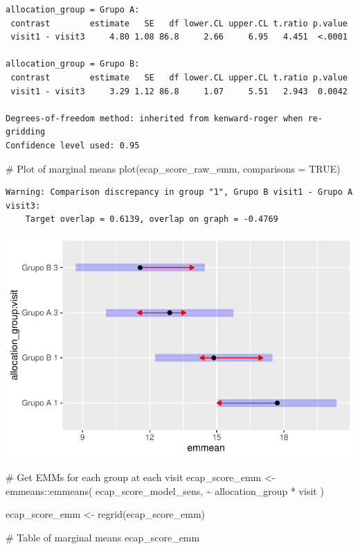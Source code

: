 \documentclass[
  letterpaper,
  DIV=11,
  numbers=noendperiod]{scrartcl}
\newenvironment{Shaded}{\begin{snugshade}}{\end{snugshade}}
\newcommand{\AttributeTok}[1]{\textcolor[rgb]{0.40,0.45,0.13}{#1}}
\newcommand{\CommentTok}[1]{\textcolor[rgb]{0.37,0.37,0.37}{#1}}
\newcommand{\ConstantTok}[1]{\textcolor[rgb]{0.56,0.35,0.01}{#1}}
\newcommand{\FunctionTok}[1]{\textcolor[rgb]{0.28,0.35,0.67}{#1}}
\newcommand{\NormalTok}[1]{\textcolor[rgb]{0.00,0.23,0.31}{#1}}
\newcommand{\OtherTok}[1]{\textcolor[rgb]{0.00,0.23,0.31}{#1}}
\newcommand{\SpecialCharTok}[1]{\textcolor[rgb]{0.37,0.37,0.37}{#1}}
\begin{document}
\begin{verbatim}
allocation_group = Grupo A:
 contrast        estimate   SE   df lower.CL upper.CL t.ratio p.value
 visit1 - visit3     4.80 1.08 86.8     2.66     6.95   4.451  <.0001

allocation_group = Grupo B:
 contrast        estimate   SE   df lower.CL upper.CL t.ratio p.value
 visit1 - visit3     3.29 1.12 86.8     1.07     5.51   2.943  0.0042

Degrees-of-freedom method: inherited from kenward-roger when re-gridding 
Confidence level used: 0.95 
\end{verbatim}

\begin{Shaded}
\begin{Highlighting}[]
\CommentTok{\# Plot of marginal means}
\FunctionTok{plot}\NormalTok{(ecap\_score\_raw\_emm, }\AttributeTok{comparisons =} \ConstantTok{TRUE}\NormalTok{)}
\end{Highlighting}
\end{Shaded}

\begin{verbatim}
Warning: Comparison discrepancy in group "1", Grupo B visit1 - Grupo A visit3:
    Target overlap = 0.6139, overlap on graph = -0.4769
\end{verbatim}

\includegraphics{Outcomes_V1V2V3_files/figure-pdf/ecap_score_raw_emm-1.pdf}

\begin{Shaded}
\begin{Highlighting}[]
\CommentTok{\# Get EMMs for each group at each visit}
\NormalTok{ecap\_score\_emm }\OtherTok{\textless{}{-}}\NormalTok{ emmeans}\SpecialCharTok{::}\FunctionTok{emmeans}\NormalTok{(}
\NormalTok{    ecap\_score\_model\_sens, }
    \SpecialCharTok{\textasciitilde{}}\NormalTok{ allocation\_group }\SpecialCharTok{*}\NormalTok{ visit}
\NormalTok{)}

\NormalTok{ecap\_score\_emm }\OtherTok{\textless{}{-}} \FunctionTok{regrid}\NormalTok{(ecap\_score\_emm)}

\CommentTok{\# Table of marginal means}
\NormalTok{ecap\_score\_emm}
\end{Highlighting}
\end{Shaded}
\end{document}
